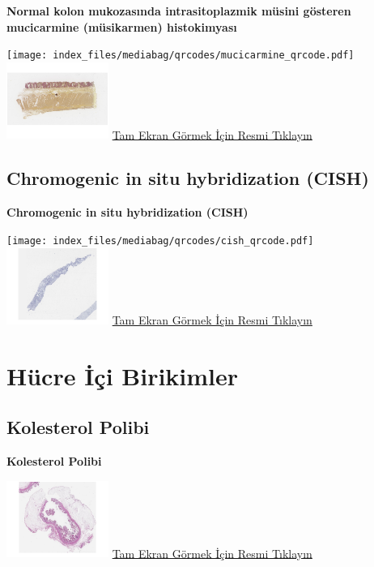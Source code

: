 \documentclass[
  letterpaper,
  DIV=11,
  numbers=noendperiod]{scrreprt}
\begin{document}
\textbf{Normal kolon mukozasında intrasitoplazmik müsini gösteren
mucicarmine (müsikarmen) histokimyası}

\texttt{[image: index\_files/mediabag/qrcodes/mucicarmine\_qrcode.pdf]}
\href{https://images.patolojiatlasi.com/mucin/mucicarmine.html}{\includegraphics[width=0.25\textwidth,height=\textheight]{./screenshots/thumbnail_mucicarmine.png}}
\href{https://images.patolojiatlasi.com/mucin/mucicarmine.html}{Tam
Ekran Görmek İçin Resmi Tıklayın}

\hypertarget{sec-chromogenic-in-situ-hybridization-cish}{%
\section{Chromogenic in situ hybridization
(CISH)}\label{sec-chromogenic-in-situ-hybridization-cish}}

\textbf{Chromogenic in situ hybridization (CISH)}

\texttt{[image: index\_files/mediabag/qrcodes/cish\_qrcode.pdf]}
\href{https://images.patolojiatlasi.com/her2-cish/cish.html}{\includegraphics[width=0.25\textwidth,height=\textheight]{./screenshots/thumbnail_cish.png}}
\href{https://images.patolojiatlasi.com/her2-cish/cish.html}{Tam Ekran
Görmek İçin Resmi Tıklayın}

\hypertarget{sec-hucre-ici-birikimler}{%
\chapter{Hücre İçi Birikimler}\label{sec-hucre-ici-birikimler}}

\hypertarget{sec-kolesterol-polibi}{%
\section{Kolesterol Polibi}\label{sec-kolesterol-polibi}}

\textbf{Kolesterol Polibi}

\href{https://images.patolojiatlasi.com/cholesterolpolyp/HE.html}{\includegraphics[width=0.25\textwidth,height=\textheight]{./screenshots/thumbnail_cholesterolpolyp.png}}
\href{https://images.patolojiatlasi.com/cholesterolpolyp/HE.html}{Tam
Ekran Görmek İçin Resmi Tıklayın}
\end{document}
